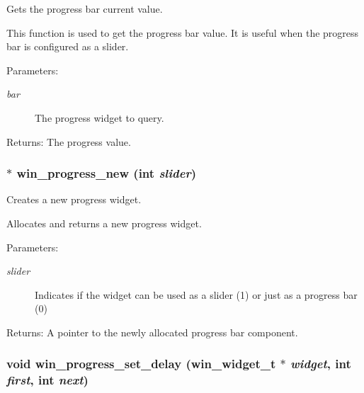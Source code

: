 Gets the progress bar current value. 

This function is used to get the progress bar value. It is useful when the progress bar is configured as a slider.

\begin{Desc}
\item[Parameters:]
\begin{description}
\item[{\em bar}]The progress widget to query. \end{description}
\end{Desc}
\begin{Desc}
\item[Returns:]The progress value. \end{Desc}
\subsubsection{$\ast$ win\_\-progress\_\-new (int {\em slider})}\label{winprogress_8h_a4}


Creates a new progress widget. 

Allocates and returns a new progress widget.

\begin{Desc}
\item[Parameters:]
\begin{description}
\item[{\em slider}]Indicates if the widget can be used as a slider (1) or just as a progress bar (0)\end{description}
\end{Desc}
\begin{Desc}
\item[Returns:]A pointer to the newly allocated progress bar component. \end{Desc}
\subsubsection{\setlength{\rightskip}{0pt plus 5cm}void win\_\-progress\_\-set\_\-delay ({\bf win\_\-widget\_\-t} $\ast$ {\em widget}, int {\em first}, int {\em next})}\label{winprogress_8h_a10}



